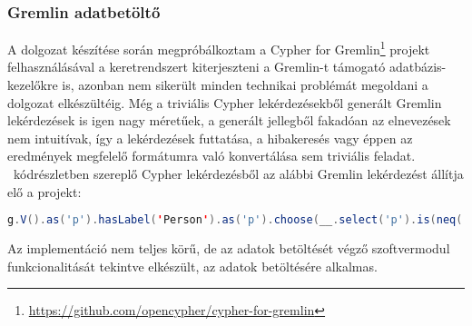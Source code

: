 \subsubsection{Gremlin adatbetöltő}
A dolgozat készítése során megpróbálkoztam a Cypher for Gremlin\footnote{\url{https://github.com/opencypher/cypher-for-gremlin}} projekt felhasználásával a keretrendszert kiterjeszteni a Gremlin-t támogató adatbázis-kezelőkre is, azonban nem sikerült minden technikai problémát megoldani a dolgozat elkészültéig. Még a triviális Cypher lekérdezésekből generált Gremlin lekérdezések is igen nagy méretűek, a generált jellegből fakadóan az elnevezések nem intuitívak, így a lekérdezések futtatása, a hibakeresés vagy éppen az eredmények megfelelő formátumra való konvertálása sem triviális feladat. ~kódrészletben szereplő Cypher lekérdezésből az alábbi Gremlin lekérdezést állítja elő a projekt:
\begin{lstlisting}[frame=single,language=Java]
g.V().as('p').hasLabel('Person').as('p').choose(__.select('p').is(neq('  cypher.null')).outE('KNOWS').inV().as('f').hasLabel('Person'), __.select('p').is(neq('  cypher.null')).outE('KNOWS').inV().as('f').hasLabel('Person'), __.constant('  cypher.null').as('f')).select('p', 'f').group().by(__.select('p').choose(neq('  cypher.null'), __.choose(__.values('name'), __.values('name'), __.constant('  cypher.null')), __.constant('  cypher.null'))).by(__.fold().project('p.name', 'count(f)').by(__.unfold().select('p').choose(neq('  cypher.null'), __.choose(__.values('name'), __.values('name'), __.constant('  cypher.null')), __.constant('  cypher.null'))).by(__.unfold().select('f').is(neq('  cypher.null')).count())).unfold().select(values)
\end{lstlisting}
Az implementáció nem teljes körű, de az adatok betöltését végző szoftvermodul funkcionalitását tekintve elkészült, az adatok betöltésére alkalmas.
